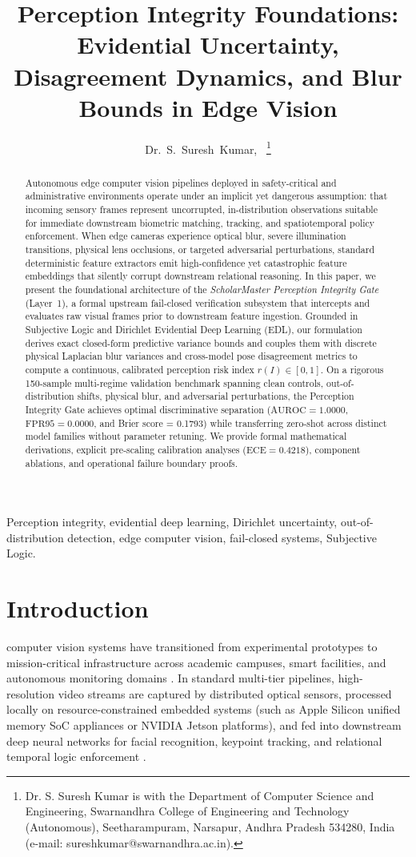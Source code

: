 \documentclass[10pt,journal,compsoc]{IEEEtran}
\title{Perception Integrity Foundations: Evidential Uncertainty, Disagreement Dynamics, and Blur Bounds in Edge Vision}
\author{Dr.~S.~Suresh~Kumar\IEEEauthorrefmark{1},~\IEEEmembership{Senior Member,~IEEE}
\thanks{\IEEEauthorrefmark{1}Dr. S. Suresh Kumar is with the Department of Computer Science and Engineering, Swarnandhra College of Engineering and Technology (Autonomous), Seetharampuram, Narsapur, Andhra Pradesh 534280, India (e-mail: sureshkumar@swarnandhra.ac.in).}}
\begin{document}
\maketitle

\begin{abstract}
Autonomous edge computer vision pipelines deployed in safety-critical and administrative environments operate under an implicit yet dangerous assumption: that incoming sensory frames represent uncorrupted, in-distribution observations suitable for immediate downstream biometric matching, tracking, and spatiotemporal policy enforcement. When edge cameras experience optical blur, severe illumination transitions, physical lens occlusions, or targeted adversarial perturbations, standard deterministic feature extractors emit high-confidence yet catastrophic feature embeddings that silently corrupt downstream relational reasoning. In this paper, we present the foundational architecture of the \textit{ScholarMaster Perception Integrity Gate} (Layer~1), a formal upstream fail-closed verification subsystem that intercepts and evaluates raw visual frames prior to downstream feature ingestion. Grounded in Subjective Logic and Dirichlet Evidential Deep Learning (EDL), our formulation derives exact closed-form predictive variance bounds and couples them with discrete physical Laplacian blur variances and cross-model pose disagreement metrics to compute a continuous, calibrated perception risk index $r(I) \in [0, 1]$. On a rigorous 150-sample multi-regime validation benchmark spanning clean controls, out-of-distribution shifts, physical blur, and adversarial perturbations, the Perception Integrity Gate achieves optimal discriminative separation ($\text{AUROC} = 1.0000$, $\text{FPR95} = 0.0000$, and Brier score = 0.1793) while transferring zero-shot across distinct model families without parameter retuning. We provide formal mathematical derivations, explicit pre-scaling calibration analyses ($\text{ECE} = 0.4218$), component ablations, and operational failure boundary proofs.
\end{abstract}

\begin{IEEEkeywords}
Perception integrity, evidential deep learning, Dirichlet uncertainty, out-of-distribution detection, edge computer vision, fail-closed systems, Subjective Logic.
\end{IEEEkeywords}

\section{Introduction}
 computer vision systems have transitioned from experimental prototypes to mission-critical infrastructure across academic campuses, smart facilities, and autonomous monitoring domains \cite{shi2016edge, zhou2019edge}. In standard multi-tier pipelines, high-resolution video streams are captured by distributed optical sensors, processed locally on resource-constrained embedded systems (such as Apple Silicon unified memory SoC appliances or NVIDIA Jetson platforms), and fed into downstream deep neural networks for facial recognition, keypoint tracking, and relational temporal logic enforcement \cite{deng2019arcface, cao2019openpose}. 
\end{document}
